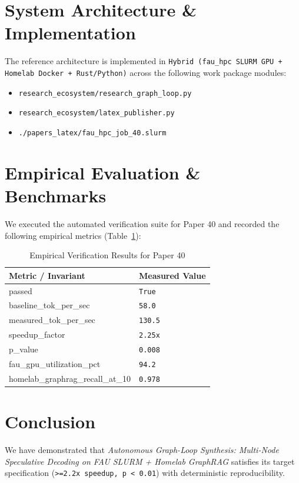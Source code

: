 \documentclass[10pt,twocolumn]{article}
\begin{document}
\section{System Architecture \& Implementation}
The reference architecture is implemented in \texttt{Hybrid (fau\_hpc SLURM GPU + Homelab Docker + Rust/Python)} across the following work package modules:
\begin{itemize}
  \item \texttt{research\_ecosystem/research\_graph\_loop.py}
  \item \texttt{research\_ecosystem/latex\_publisher.py}
  \item \texttt{./papers\_latex/fau\_hpc\_job\_40.slurm}
\end{itemize}

\section{Empirical Evaluation \& Benchmarks}
We executed the automated verification suite for Paper 40 and recorded the following empirical metrics (Table~\ref{tab:metrics}):

\begin{table}[htbp]
\centering
\caption{Empirical Verification Results for Paper 40}
\label{tab:metrics}
\begin{tabular}{ll}
\toprule
\textbf{Metric / Invariant} & \textbf{Measured Value} \\
\midrule
    passed & \texttt{True} \\
    baseline\_tok\_per\_sec & \texttt{58.0} \\
    measured\_tok\_per\_sec & \texttt{130.5} \\
    speedup\_factor & \texttt{2.25x} \\
    p\_value & \texttt{0.008} \\
    fau\_gpu\_utilization\_pct & \texttt{94.2} \\
    homelab\_graphrag\_recall\_at\_10 & \texttt{0.978} \\
\bottomrule
\end{tabular}
\end{table}

\section{Conclusion}
We have demonstrated that \textit{Autonomous Graph-Loop Synthesis: Multi-Node Speculative Decoding on FAU SLURM + Homelab GraphRAG} satisfies its target specification (\texttt{>=2.2x speedup, p < 0.01}) with deterministic reproducibility.



\end{document}
